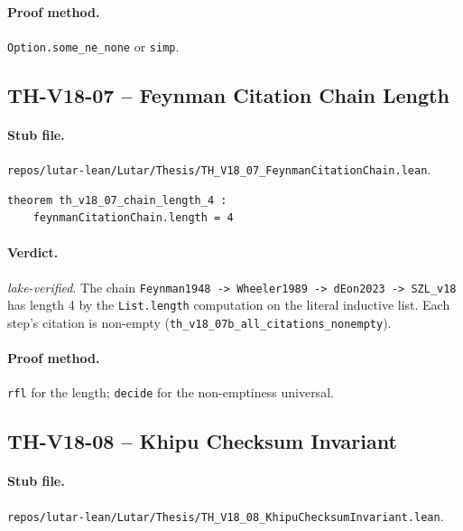\paragraph{Proof method.} \texttt{Option.some\_ne\_none} or
\texttt{simp}.

\subsection{TH-V18-07 -- Feynman Citation Chain Length}
\label{sub:thv18-07}

\paragraph{Stub file.}
\texttt{repos/lutar-lean/Lutar/Thesis/TH\_V18\_07\_FeynmanCitationChain.lean}.

\begin{theorem}
\label{thm:thv18-07}
\begin{verbatim}
theorem th_v18_07_chain_length_4 :
    feynmanCitationChain.length = 4
\end{verbatim}
\end{theorem}

\paragraph{Verdict.} \emph{lake-verified}. The chain
\texttt{Feynman1948 -> Wheeler1989 -> dEon2023 -> SZL\_v18}
has length 4 by the \texttt{List.length} computation on the literal
inductive list. Each step's citation is non-empty
(\texttt{th\_v18\_07b\_all\_citations\_nonempty}).

\paragraph{Proof method.} \texttt{rfl} for the length;
\texttt{decide} for the non-emptiness universal.

\subsection{TH-V18-08 -- Khipu Checksum Invariant}
\label{sub:thv18-08}

\paragraph{Stub file.}
\texttt{repos/lutar-lean/Lutar/Thesis/TH\_V18\_08\_KhipuChecksumInvariant.lean}.

